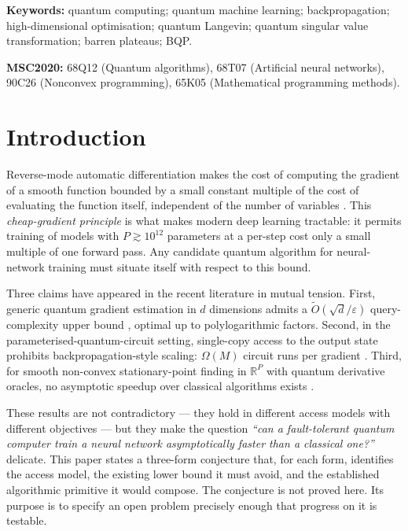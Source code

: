 \documentclass[11pt,a4paper]{article}
\theoremstyle{definition}
\newcommand{\Otil}{\widetilde{O}}
\newcommand{\R}{\mathbb{R}}
\newcommand{\veps}{\varepsilon}
\begin{document}
\medskip

\noindent\textbf{Keywords:} quantum computing; quantum machine learning; backpropagation; high-dimensional optimisation; quantum Langevin; quantum singular value transformation; barren plateaus; \textsf{BQP}.

\medskip

\noindent\textbf{MSC2020:} 68Q12 (Quantum algorithms), 68T07 (Artificial neural networks), 90C26 (Nonconvex programming), 65K05 (Mathematical programming methods).

\tableofcontents

\section{Introduction}\label{sec:intro}

Reverse-mode automatic differentiation makes the cost of computing the gradient of a smooth function bounded by a small constant multiple of the cost of evaluating the function itself, independent of the number of variables \cite{BaurStrassen1983}. This \emph{cheap-gradient principle} is what makes modern deep learning tractable: it permits training of models with $P \gtrsim 10^{12}$ parameters at a per-step cost only a small multiple of one forward pass. Any candidate quantum algorithm for neural-network training must situate itself with respect to this bound.

Three claims have appeared in the recent literature in mutual tension. First, generic quantum gradient estimation in $d$ dimensions admits a $\Otil(\sqrt{d}/\veps)$ query-complexity upper bound \cite{GAW2019}, optimal up to polylogarithmic factors. Second, in the parameterised-quantum-circuit setting, single-copy access to the output state prohibits backpropagation-style scaling: $\Omega(M)$ circuit runs per gradient \cite{AbbasEtAl2023}. Third, for smooth non-convex stationary-point finding in $\R^P$ with quantum derivative oracles, no asymptotic speedup over classical algorithms exists \cite{ZhangLengLi2023}.

These results are not contradictory --- they hold in different access models with different objectives --- but they make the question \emph{``can a fault-tolerant quantum computer train a neural network asymptotically faster than a classical one?''} delicate. This paper states a three-form conjecture that, for each form, identifies the access model, the existing lower bound it must avoid, and the established algorithmic primitive it would compose. The conjecture is not proved here. Its purpose is to specify an open problem precisely enough that progress on it is testable.
\end{document}
